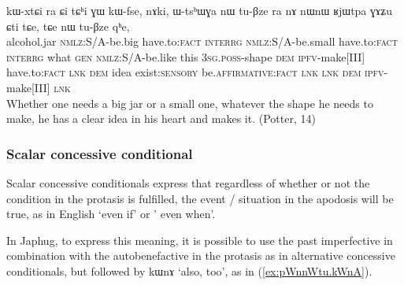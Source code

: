 \documentclass[oldfontcommands,oneside,a4paper,11pt]{article}
\newcommand{\ipa}[1]{{\phon \mbox{#1}}} %
\newcommand{\refb}[1]{(\ref{#1})}
\begin{document}
\begin{exe}
\ex  \label{ex:RjWtpa}
\gll
[\ipa{tɕʰorzi}   	\ipa{kɯ-wxti}   	\ipa{ra}]   	\ipa{ɕi,}   	\ipa{kɯ-xtɕi}   	\ipa{ra}   	\ipa{ɕi}   	\ipa{tɕʰi}   	\ipa{ɣɯ}   	\ipa{kɯ-fse,}   	\ipa{nɤki,}   	\ipa{ɯ-tsʰɯɣa}   	\ipa{nɯ}   	\ipa{tu-βze}   	\ipa{ra}   	\ipa{nɤ}   	\ipa{nɯnɯ}   	\ipa{ʁjɯtpa}   	\ipa{ɣɤʑu}   	\ipa{ɕti}   	\ipa{tɕe,}   	\ipa{tɕe}   	\ipa{nɯ}   	\ipa{tu-βze}   	\ipa{qʰe,}   \\
alcohol.jar \textsc{nmlz}:S/A-be.big have.to:\textsc{fact} \textsc{interrg} \textsc{nmlz}:S/A-be.small have.to:\textsc{fact} \textsc{interrg} what \textsc{gen} \textsc{nmlz}:S/A-be.like this \textsc{3sg.poss}-shape \textsc{dem} \textsc{ipfv}-make[III]  have.to:\textsc{fact} \textsc{lnk} \textsc{dem} idea
exist:\textsc{sensory} be.\textsc{affirmative}:\textsc{fact} \textsc{lnk} \textsc{lnk} \textsc{dem} \textsc{ipfv}-make[III]  \textsc{lnk} \\
\glt Whether one needs a big jar or a small one, whatever the shape he needs to make, he has a clear idea in his heart and makes it. (Potter, 14)
\end{exe}
\subsubsection{Scalar concessive conditional}
Scalar concessive conditionals express that regardless of whether or not the condition in the protasis is fulfilled, the event / situation in the apodosis will be true, as in English `even if' or ' even when'.


In Japhug, to express this meaning, it is possible to use the past imperfective in combination with the autobenefactive in the protasis as in alternative concessive conditionals, but followed by \ipa{kɯnɤ} `also, too', as in \refb{ex:pWnnWtu.kWnA}.
\end{document}
